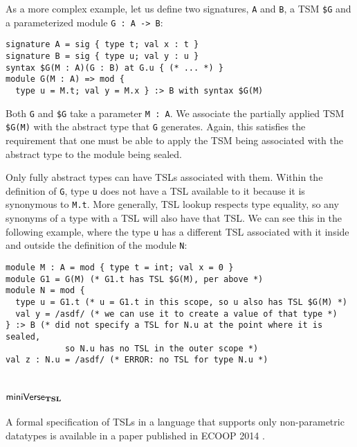 As a more complex example, let us define two signatures, \lstinline{A} and \lstinline{B}, a TSM \texttt{\$G} and a parameterized module \lstinline{G : A -> B}:
\begin{lstlisting}[numbers=none,mathescape=|]
signature A = sig { type t; val x : t }
signature B = sig { type u; val y : u }
syntax $G(M : A)(G : B) at G.u { (* ... *) }
module G(M : A) => mod { 
  type u = M.t; val y = M.x } :> B with syntax $G(M)
\end{lstlisting}
Both \lstinline{G} and \texttt{\$G} take a parameter \lstinline{M : A}. We associate the partially applied TSM \texttt{\$G(M)} with the abstract type that \lstinline{G} generates. Again, this satisfies the requirement that one must be able to apply the TSM being associated with the abstract type to the module being sealed. 

Only fully abstract types can have TSLs associated with them. Within the definition of \lstinline{G}, type \lstinline{u} does not have a TSL available to it because it is synonymous to \lstinline{M.t}. More generally, TSL lookup respects type equality, so any synonyms of a type with a TSL will also have that TSL. We can see this in the following example, where the type \lstinline{u} has a different TSL associated with it inside and outside the definition of the module \lstinline{N}:
\begin{lstlisting}[numbers=none,mathescape=|]
module M : A = mod { type t = int; val x = 0 }
module G1 = G(M) (* G1.t has TSL $G(M), per above *)
module N = mod { 
  type u = G1.t (* u = G1.t in this scope, so u also has TSL $G(M) *)
  val y = /asdf/ (* we can use it to create a value of that type *) 
} :> B (* did not specify a TSL for N.u at the point where it is sealed, 
            so N.u has no TSL in the outer scope *)
val z : N.u = /asdf/ (* ERROR: no TSL for type N.u *)
\end{lstlisting}

\section{\texorpdfstring{$\mathsf{miniVerse}_\textbf{TSL}$}{miniVerseTSL}}
A formal specification of TSLs in a language that supports only non-parametric datatypes is available in a paper published in ECOOP 2014 \cite{TSLs}. %
